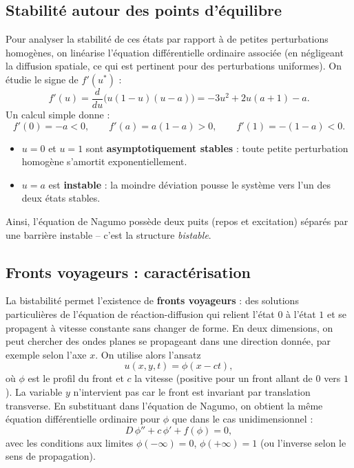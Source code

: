 \documentclass[11pt,a4paper]{report}
\begin{document}
\subsection*{Stabilité autour des points d’équilibre}

Pour analyser la stabilité de ces états par rapport à de petites perturbations homogènes, on linéarise l’équation différentielle ordinaire associée (en négligeant la diffusion spatiale, ce qui est pertinent pour des perturbations uniformes). On étudie le signe de $f'(u^*)$ :
\[
f'(u) = \frac{d}{du}\bigl(u(1-u)(u-a)\bigr) = -3u^2 + 2u(a+1) -a.
\]
Un calcul simple donne :
\[
f'(0) = -a < 0,\qquad f'(a) = a(1-a) > 0,\qquad f'(1) = -(1-a) < 0.
\]

\begin{itemize}
  \item $u=0$ et $u=1$ sont \textbf{asymptotiquement stables} : toute petite perturbation homogène s’amortit exponentiellement.
  \item $u=a$ est \textbf{instable} : la moindre déviation pousse le système vers l’un des deux états stables.
\end{itemize}

Ainsi, l’équation de Nagumo possède deux puits (repos et excitation) séparés par une barrière instable – c’est la structure \textit{bistable}.



\subsection*{Fronts voyageurs : caractérisation}

La bistabilité permet l’existence de \textbf{fronts voyageurs} : des solutions particulières de l’équation de réaction-diffusion qui relient l’état $0$ à l’état $1$ et se propagent à vitesse constante sans changer de forme. En deux dimensions, on peut chercher des ondes planes se propageant dans une direction donnée, par exemple selon l’axe $x$. On utilise alors l’ansatz
\[
u(x,y,t) = \phi(x - c t),
\]
où $\phi$ est le profil du front et $c$ la vitesse (positive pour un front allant de $0$ vers $1$). La variable $y$ n’intervient pas car le front est invariant par translation transverse. En substituant dans l’équation de Nagumo, on obtient la même équation différentielle ordinaire pour $\phi$ que dans le cas unidimensionnel :
\[
D\,\phi'' + c\,\phi' + f(\phi) = 0,
\]
avec les conditions aux limites $\phi(-\infty)=0$, $\phi(+\infty)=1$ (ou l’inverse selon le sens de propagation).
\end{document}
